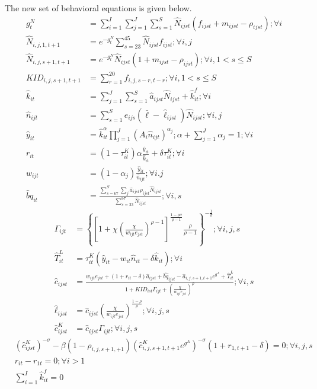\documentclass[letterpaper,12pt]{article}
\theoremstyle{definition}
\numberwithin{equation}{section}
\begin{document}
\begin{spacing}{1.5}
	The new set of behavioral equations is given below.
	\begin{align}
		g^N_t & = \sum_{i=1}^I \sum_{j=1}^J \sum_{s=1}^S \hat N_{ijst} (f_{ijst}+m_{ijst}-\rho_{ijst}) ; \forall i\\
		\hat N_{i,j,1,t+1} & = e^{-g^N_t}\sum_{s=23}^{45} \hat N_{ijst} f_{ijst} ; \forall i,j\\
		\hat N_{i,j,s+1,t+1} & = e^{-g^N_t}\hat N_{ijst} (1+m_{ijst}-\rho_{ijst}); \forall i, 1<s\le S \\
		KID_{i,j,s+1,t+1} & = \sum_{r=1}^{20} f_{i,j,s-r,t-r}; \forall i, 1<s\le S \\
	    \hat k_{it} & = \sum_{j=1}^J \sum_{s=1}^S \hat a_{ijst} \hat N_{ijst} + \hat k_{it}^f; \forall i \\
		\hat n_{ijt} & = \sum_{s=1}^S e_{ijs} (\bar \ell - \hat \ell_{ijst}) \hat N_{ijst}; \forall i,j \\
		\hat y_{it} & = \hat k_{it}^\alpha \prod_{j=1}^J \left( A_{i} \hat n_{ijt} \right)^{\alpha_j}; \alpha + \sum_{j=1}^J \alpha_j = 1 ; \forall i \\
		r_{it} & = (1-\tau^K_{it})\alpha \frac{\hat y_{it}}{\hat k_{it}} + \delta \tau^K_{it}; \forall i \\
		w_{ijt} & = (1-\alpha_j) \frac{\hat y_{it}}{\hat n_{ijt}}; \forall i.j \\
		\hat bq_{it} & = \frac{\sum_{s=67}^S \sum_j \hat a_{ijst} \rho_{ijst} \hat N_{ijst}}{\sum_{s=23}^{67} \hat N_{ijst}} ; \forall i,s
	\end{align}
	\begin{align}
		\Gamma_{ijt} & = \left\{ \left[1 + \chi \left(\frac{\chi}{w_{ijt} e_{jst}}\right)^{\rho-1}\right]^{\tfrac{1-\rho \sigma}{\rho-1}} \frac{\rho}{\rho-1} \right\}^{-\tfrac{1}{\sigma}}; \forall i,j,s \\
		\hat T^L_{it} & = \tau^K_{it} (\hat y_{it} - w_{it}\hat n_{it} - \delta \hat k_{it}); \forall i \\
    	\hat c_{ijst} & = \frac{w_{ijt} e_{jst} + (1+r_{it}-\delta)\hat a_{ijst} + \hat{bq}_{ijst} - \hat a_{i,j,s+1,t+1} e^{g^A} + \hat T^L_{it}} {1 + KID_{ist}\Gamma_{ijt} + \left(\tfrac{\chi}{w_{ijt}e_{jst}}\right)^\rho}; \forall i,s \\
		\hat \ell_{ijst} & = \hat c_{ijst} \left(\frac{\chi}{w_{ijt}e_{jst}}\right)^{\frac{1-\rho}{\rho}} ; \forall i,j,s \\
		\hat c^K_{ijst} & = \hat c_{ijst} \Gamma_{ijt}; \forall i,j,s
	\end{align}
	\begin{align}
		& \left({\hat c^K_{ijst}}\right)^{-\sigma} - \beta (1-\rho_{i,j,s+1,+1}) \left(\hat c^K_{i,j,s+1,t+1} e^{g^A}\right)^{-\sigma}(1+r_{1,t+1}-\delta) = 0; \forall i,j,s \\
		& r_{it} - r_{1t} = 0; \forall i>1 \\
		& \sum_{i=1}^I \hat k^f_{it} = 0
	\end{align}

\end{spacing}
\end{document}
